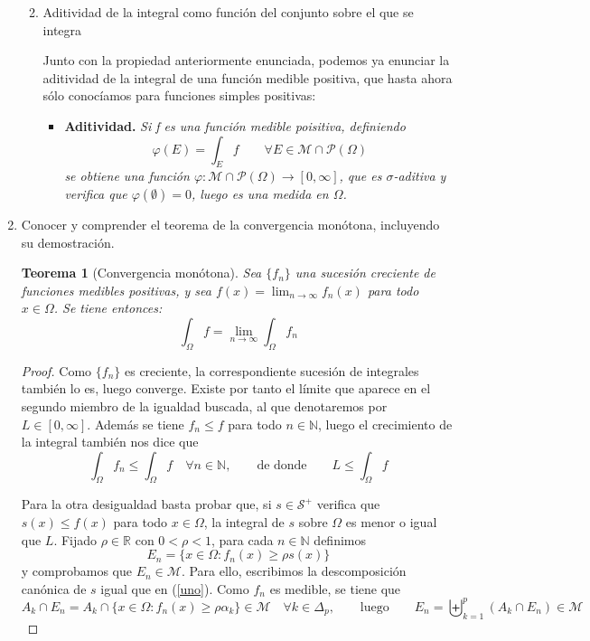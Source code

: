 \documentclass[a4paper, 12pt]{article}
\newtheorem*{teorema*}{Teorema}
\begin{document}
\begin{enumerate}[label=\textbf{\arabic*}.]
\begin{enumerate}[label=\textit{\alph*)}]
	\medskip
	
	\item Aditividad de la integral como función del conjunto sobre el que se integra
	
	Junto con la propiedad anteriormente enunciada, podemos ya enunciar la aditividad de la integral de una función medible positiva, que hasta ahora sólo conocíamos para funciones simples positivas:
	\begin{itemize}
		\item \textbf{Aditividad.} \textit{Si f es una función medible poisitiva, definiendo}
		\[
			\varphi (E) = \int_E f \qquad \forall E \in \mathcal{M} \cap \mathcal{P} (\Omega)
		\]
		\textit{se obtiene una función \(\varphi: \mathcal{M} \cap \mathcal{P} (\Omega) \to [0, \infty]\), que es \(\sigma\)-aditiva y verifica que \(\varphi ( \emptyset) = 0\), luego es una medida en \(\Omega\).}
	\end{itemize}
\end{enumerate}

\bigskip

\item Conocer y comprender el teorema de la convergencia monótona, incluyendo su demostración.

\begin{teorema*}[Convergencia monótona]
Sea \(\{f_n\}\) una sucesión creciente de funciones medibles positivas, y sea \(f(x) = \lim_{n \to \infty} f_n (x)\) para todo \(x \in \Omega\). Se tiene entonces:
\[
	\int_{\Omega} f = \lim_{n \to \infty} \int_{\Omega} f_n
\]
\end{teorema*}

\begin{proof}
Como \(\{f_n\}\) es creciente, la correspondiente sucesión de integrales también lo es, luego converge. Existe por tanto el límite que aparece en el segundo miembro de la igualdad buscada, al que denotaremos por \(L \in [0, \infty]\). Además se tiene \(f_n \leq f\) para todo \(n \in \mathbb{N}\), luego el crecimiento de la integral también nos dice que 
\[
	\int_{\Omega} f_n \leq \int_{\Omega} f \quad \forall n \in \mathbb{N}, \qquad \text{de donde} \qquad L \leq \int_{\Omega} f
\]

Para la otra desigualdad basta probar que, si \(s \in \mathcal{S}^+\) verifica que \(s(x) \leq f(x)\) para todo \(x \in \Omega\), la integral de \(s\) sobre \(\Omega\) es menor o igual que \(L\). Fijado \(\rho \in \mathbb{R}\) con \(0 < \rho < 1\), para cada \(n \in \mathbb{N}\) definimos
\[
	E_n = \{ x \in \Omega : f_n(x) \geq \rho s(x)\}
\]
y comprobamos que \(E_n \in \mathcal{M}\). Para ello, escribimos la descomposición canónica de \(s\) igual que en (\ref{uno}). Como \(f_n\) es medible, se tiene que
\[
	A_k \cap E_n = A_k \cap \{x \in \Omega: f_n(x) \geq \rho \alpha_k\} \in \mathcal{M} \quad \forall k \in \Delta_p, \qquad \text{luego} \qquad E_n = \biguplus_{k=1}^{p} (A_k \cap E_n) \in \mathcal{M}
\]


\end{proof}
\end{enumerate}
\end{document}
